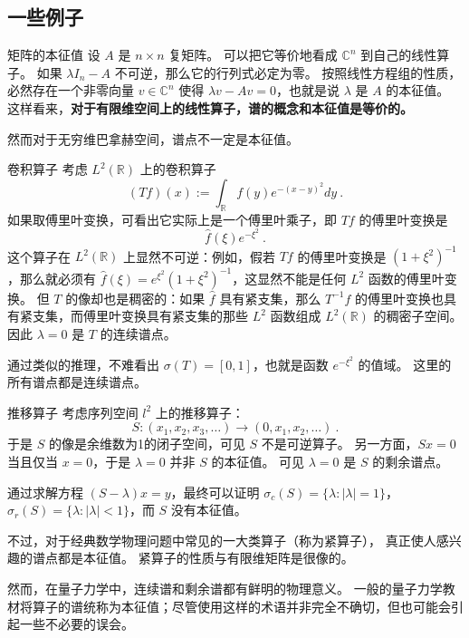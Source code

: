 \subsection{一些例子}
\begin{example}{矩阵的本征值}
设 $A$ 是 $n\times n$ 复矩阵。 可以把它等价地看成 $\mathbb{C}^n$ 到自己的线性算子。 如果 $\lambda I_n-A$ 不可逆，那么它的行列式必定为零。 按照线性方程组的性质，必然存在一个非零向量 $v\in \mathbb{C}^n$ 使得 $\lambda v-Av=0$，也就是说 $\lambda$ 是 $A$ 的本征值。 这样看来，\textbf{对于有限维空间上的线性算子，谱的概念和本征值是等价的。}
\end{example}

然而对于无穷维巴拿赫空间，谱点不一定是本征值。

\begin{example}{卷积算子}
考虑 $L^2(\mathbb{R})$ 上的卷积算子
$$
(Tf)(x):=\int_{\mathbb{R}}f(y)e^{-(x-y)^2}dy~.
$$
如果取傅里叶变换，可看出它实际上是一个傅里叶乘子，即 $Tf$ 的傅里叶变换是
$$
\hat f(\xi)e^{-\xi^2}~.
$$
这个算子在 $L^2(\mathbb{R})$ 上显然不可逆：例如，假若 $Tf$ 的傅里叶变换是 $(1+\xi^2)^{-1}$，那么就必须有 $\hat f(\xi)=e^{\xi^2}(1+\xi^2)^{-1}$，这显然不能是任何 $L^2$ 函数的傅里叶变换。 但 $T$ 的像却也是稠密的：如果 $\hat f$ 具有紧支集，那么 $T^{-1}f$ 的傅里叶变换也具有紧支集，而傅里叶变换具有紧支集的那些 $L^2$ 函数组成 $L^2(\mathbb{R})$ 的稠密子空间。 因此 $\lambda=0$ 是 $T$ 的连续谱点。

通过类似的推理，不难看出 $\sigma(T)=[0,1]$，也就是函数 $e^{-\xi^2}$ 的值域。 这里的所有谱点都是连续谱点。
\end{example}

\begin{example}{推移算子}
考虑序列空间 $l^2$ 上的推移算子：
$$
S:(x_1,x_2,x_3,\dots)\to(0,x_1,x_2,\dots)~.
$$
于是 $S$ 的像是余维数为1的闭子空间，可见 $S$ 不是可逆算子。 另一方面，$Sx=0$ 当且仅当 $x=0$，于是 $\lambda=0$ 并非 $S$ 的本征值。 可见 $\lambda=0$ 是 $S$ 的剩余谱点。

通过求解方程 $(S-\lambda)x=y$，最终可以证明 $\sigma_c(S)=\{\lambda:|\lambda|=1\}$，$\sigma_r(S)=\{\lambda:|\lambda|<1\}$，而 $S$ 没有本征值。
\end{example}

不过，对于经典数学物理问题中常见的一大类算子（称为紧算子）， 真正使人感兴趣的谱点都是本征值。 紧算子的性质与有限维矩阵是很像的。

然而，在量子力学中，连续谱和剩余谱都有鲜明的物理意义。 一般的量子力学教材将算子的谱统称为本征值；尽管使用这样的术语并非完全不确切，但也可能会引起一些不必要的误会。
